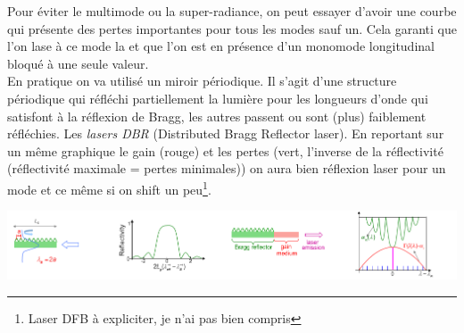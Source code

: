 	Pour éviter le multimode ou la super-radiance, on peut essayer d'avoir une courbe qui présente des
	pertes importantes pour tous les modes sauf un. Cela garanti que l'on lase à ce mode la et que 
	l'on est en présence d'un monomode longitudinal bloqué à une seule valeur.\\
\newpage	
	En pratique on va utilisé un miroir périodique. Il s'agit d'une structure périodique qui réfléchi
	partiellement la lumière pour les longueurs d'onde qui satisfont à la réflexion de Bragg, les 
	autres passent ou sont (plus) faiblement réfléchies. Les \textit{lasers DBR} (Distributed 
	Bragg Reflector laser). En reportant sur un même graphique le gain (rouge) et les pertes (vert, 
	l'inverse de la réflectivité (réflectivité maximale = pertes minimales)) on aura bien 
	réflexion laser pour un mode et ce même si on shift un peu\footnote{Laser DFB à expliciter, je 
	n'ai pas bien compris}.
	\begin{center}
	\includegraphics[scale=0.6]{ch5/image56}
	\end{center}